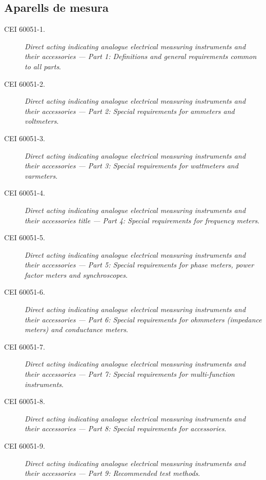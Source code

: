 \subsection*{Aparells de mesura}
\begin{description}
	\item [\hspace{5mm}CEI 60051-1.] \textit{Direct acting indicating analogue electrical measuring instruments and their accessories --- Part 1: Definitions and general requirements common to all parts}.
	\item [\hspace{5mm}CEI 60051-2.] \textit{Direct acting indicating analogue electrical measuring instruments and their accessories --- Part 2: Special requirements for ammeters and voltmeters}.
	\item [\hspace{5mm}CEI 60051-3.] \textit{Direct acting indicating analogue electrical measuring instruments and their accessories --- Part 3: Special requirements for wattmeters and varmeters}.
	\item [\hspace{5mm}CEI 60051-4.] \textit{Direct acting indicating analogue electrical measuring instruments and their accessories title --- Part 4: Special requirements for frequency meters}.
	\item [\hspace{5mm}CEI 60051-5.] \textit{Direct acting indicating analogue electrical measuring instruments and their accessories --- Part 5: Special requirements for phase meters, power factor meters and synchroscopes}.
	\item [\hspace{5mm}CEI 60051-6.] \textit{Direct acting indicating analogue electrical measuring instruments and their accessories --- Part 6: Special requirements for ohmmeters (impedance meters) and conductance meters}.
	\item [\hspace{5mm}CEI 60051-7.] \textit{Direct acting indicating analogue electrical measuring instruments and their accessories --- Part 7: Special requirements for multi-function instruments}.
	\item [\hspace{5mm}CEI 60051-8.] \textit{Direct acting indicating analogue electrical measuring instruments and their accessories --- Part 8: Special requirements for accessories}.
	\item [\hspace{5mm}CEI 60051-9.] \textit{Direct acting indicating analogue electrical measuring instruments and their accessories --- Part 9: Recommended test methods}.
\end{description}


